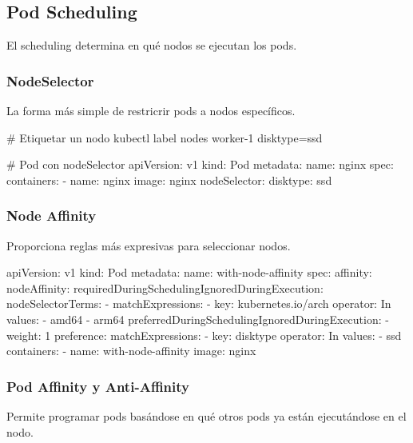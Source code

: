 \documentclass[11pt,a4paper]{article}
\begin{document}
\subsection{Pod Scheduling}

El scheduling determina en qué nodos se ejecutan los pods.

\subsubsection{NodeSelector}

La forma más simple de restricrir pods a nodos específicos.

\begin{commandbox}
\# Etiquetar un nodo
kubectl label nodes worker-1 disktype=ssd

\# Pod con nodeSelector
apiVersion: v1
kind: Pod
metadata:
  name: nginx
spec:
  containers:
  - name: nginx
    image: nginx
  nodeSelector:
    disktype: ssd
\end{commandbox}

\subsubsection{Node Affinity}

Proporciona reglas más expresivas para seleccionar nodos.

\begin{commandbox}
apiVersion: v1
kind: Pod
metadata:
  name: with-node-affinity
spec:
  affinity:
    nodeAffinity:
      requiredDuringSchedulingIgnoredDuringExecution:
        nodeSelectorTerms:
        - matchExpressions:
          - key: kubernetes.io/arch
            operator: In
            values:
            - amd64
            - arm64
      preferredDuringSchedulingIgnoredDuringExecution:
      - weight: 1
        preference:
          matchExpressions:
          - key: disktype
            operator: In
            values:
            - ssd
  containers:
  - name: with-node-affinity
    image: nginx
\end{commandbox}

\subsubsection{Pod Affinity y Anti-Affinity}

Permite programar pods basándose en qué otros pods ya están ejecutándose en el nodo.
\end{document}
